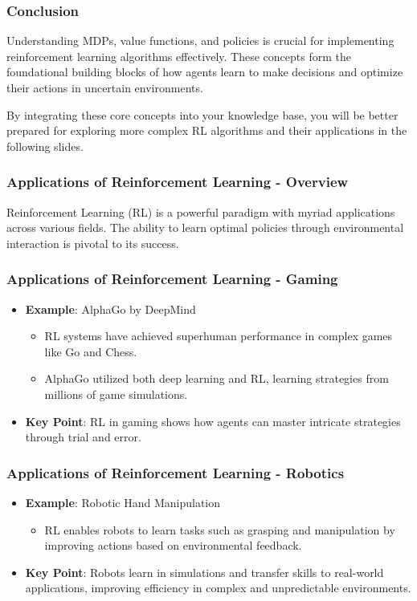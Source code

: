 \documentclass[aspectratio=169]{beamer}
\begin{document}
\begin{frame}[fragile]
    \frametitle{Conclusion}
    Understanding MDPs, value functions, and policies is crucial for implementing reinforcement learning algorithms effectively. These concepts form the foundational building blocks of how agents learn to make decisions and optimize their actions in uncertain environments. 

    By integrating these core concepts into your knowledge base, you will be better prepared for exploring more complex RL algorithms and their applications in the following slides.
\end{frame}

\begin{frame}[fragile]
    \frametitle{Applications of Reinforcement Learning - Overview}
    Reinforcement Learning (RL) is a powerful paradigm with myriad applications across various fields. 
    The ability to learn optimal policies through environmental interaction is pivotal to its success.
\end{frame}

\begin{frame}[fragile]
    \frametitle{Applications of Reinforcement Learning - Gaming}
    \begin{itemize}
        \item \textbf{Example}: AlphaGo by DeepMind
        \begin{itemize}
            \item RL systems have achieved superhuman performance in complex games like Go and Chess.
            \item AlphaGo utilized both deep learning and RL, learning strategies from millions of game simulations.
        \end{itemize}
        \item \textbf{Key Point}: RL in gaming shows how agents can master intricate strategies through trial and error.
    \end{itemize}
\end{frame}

\begin{frame}[fragile]
    \frametitle{Applications of Reinforcement Learning - Robotics}
    \begin{itemize}
        \item \textbf{Example}: Robotic Hand Manipulation
        \begin{itemize}
            \item RL enables robots to learn tasks such as grasping and manipulation by improving actions based on environmental feedback.
        \end{itemize}
        \item \textbf{Key Point}: Robots learn in simulations and transfer skills to real-world applications, improving efficiency in complex and unpredictable environments.
    \end{itemize}
\end{frame}
\end{document}
